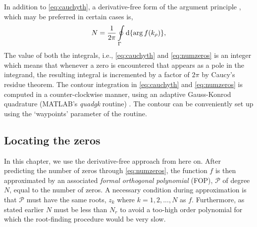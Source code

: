 \documentclass[12pt]{article}
\begin{document}
In addition to \eqref{eq:cauchyth}, a derivative-free form of the argument principle \cite{Carpentier1982c,Gillan2006c}, which may be preferred in certain cases is,
%
\begin{equation}
 N = \frac{1}{2 \pi} \oint \limits_{\Gamma} \mathop{}\!\mathrm{d} {\{ \arg f(k_{\rho})\}},
 \label{eq:numzeros}
\end{equation}
%
The value of both the integrals, i.e., \eqref{eq:cauchyth} and \eqref{eq:numzeros} is an integer which means that whenever a zero is encountered that appears as a pole in the integrand, the resulting integral is incremented by a factor of $2 \pi$ by Caucy's residue theorem. The contour integration in \eqref{eq:cauchyth} and \eqref{eq:numzeros} is computed in a counter-clockwise manner, using an adaptive Gauss-Konrod quadrature ({MATLAB}'s \emph{quadgk} routine) \cite{Shampine2008}. The contour can be conveniently set up using the `waypoints' parameter of the routine.
\subsection{Locating the zeros}
%
In this chapter, we use the derivative-free approach from here on. After predicting the number of zeros through \eqref{eq:numzeros}, the function $f$ is then approximated by an associated \emph{formal orthogonal polynomial} (FOP), $\mathcal P$ of degree $N$, equal to the number of zeros. A necessary condition during approximation is that $\mathcal P$ must have the same roots, $z_k$ where $k = 1,2,...,N$ as $f$. Furthermore, as stated earlier $N$ must be less than $N_r$ to avoid a too-high order polynomial for which the root-finding procedure would be very slow.
\end{document}
